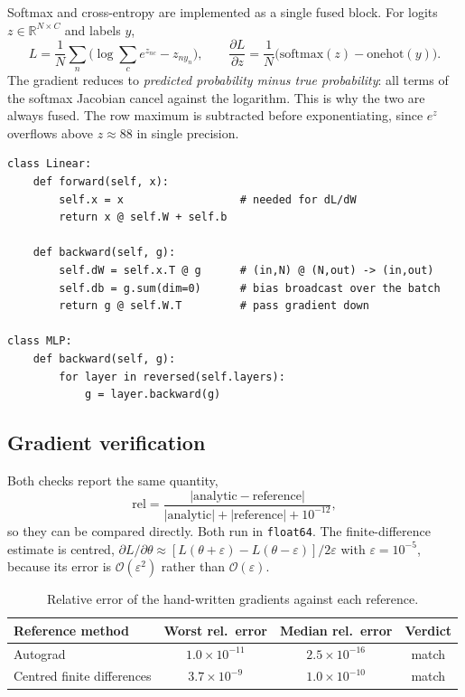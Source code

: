 \documentclass[11pt,a4paper]{article}
\begin{document}
Softmax and cross-entropy are implemented as a single fused block. For logits
$z \in \mathbb{R}^{N \times C}$ and labels $y$,
%
\begin{equation}
L = \frac{1}{N}\sum_{n}\Big(\log \textstyle\sum_c e^{z_{nc}} - z_{n y_n}\Big),
\qquad
\frac{\partial L}{\partial z} = \frac{1}{N}\big(\mathrm{softmax}(z) - \mathrm{onehot}(y)\big).
\end{equation}
%
The gradient reduces to \emph{predicted probability minus true probability}:
all terms of the softmax Jacobian cancel against the logarithm. This is why the
two are always fused. The row maximum is subtracted before exponentiating,
since $e^{z}$ overflows above $z \approx 88$ in single precision.

\begin{lstlisting}[caption={Linear layer and the reverse sweep -- no autograd.}]
class Linear:
    def forward(self, x):
        self.x = x                  # needed for dL/dW
        return x @ self.W + self.b

    def backward(self, g):
        self.dW = self.x.T @ g      # (in,N) @ (N,out) -> (in,out)
        self.db = g.sum(dim=0)      # bias broadcast over the batch
        return g @ self.W.T         # pass gradient down

class MLP:
    def backward(self, g):
        for layer in reversed(self.layers):
            g = layer.backward(g)
\end{lstlisting}

\subsection{Gradient verification}

Both checks report the same quantity,
%
\begin{equation}
\mathrm{rel} = \frac{|\text{analytic} - \text{reference}|}
                    {|\text{analytic}| + |\text{reference}| + 10^{-12}},
\end{equation}
%
so they can be compared directly. Both run in \texttt{float64}. The
finite-difference estimate is centred,
$\partial L/\partial\theta \approx [L(\theta+\varepsilon)-L(\theta-\varepsilon)]/2\varepsilon$
with $\varepsilon = 10^{-5}$, because its error is $\mathcal{O}(\varepsilon^2)$
rather than $\mathcal{O}(\varepsilon)$.

\begin{table}[H]
\centering\small
\caption{Relative error of the hand-written gradients against each reference.}
\begin{tabular}{lccc}
\toprule
Reference method & Worst rel.\ error & Median rel.\ error & Verdict \\
\midrule
Autograd                    & $1.0\times10^{-11}$ & $2.5\times10^{-16}$ & match \\
Centred finite differences   & $3.7\times10^{-9}$  & $1.0\times10^{-10}$ & match \\
\bottomrule
\end{tabular}
\end{table}
\end{document}
